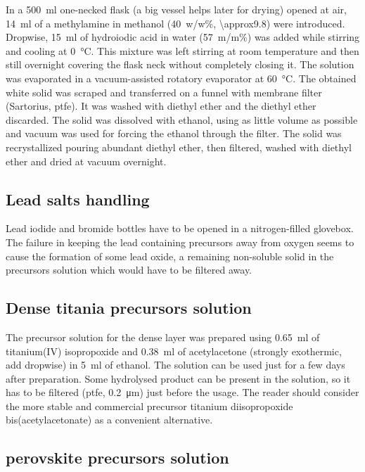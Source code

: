 		In a \SI{500}{\ml} one-necked flask (a big vessel helps later for drying) opened at air, \SI{14}{\ml} of a methylamine in methanol (40~w/w\%, \SI{\approx9.8}{\Molar}) were introduced. Dropwise, \SI{15}{\ml} of hydroiodic acid in water (57~m/m\%) was added while stirring and cooling at \SI{0}{\celsius}. This mixture was left stirring at room temperature and then still overnight covering the flask neck without completely closing it.
		The solution was evaporated in a vacuum-assisted rotatory evaporator at \SI{60}{\celsius}.
		The obtained white solid was scraped and transferred on a funnel with membrane filter (Sartorius, \gls{ptfe}). It was washed with diethyl ether and the diethyl ether discarded. The solid was dissolved with ethanol, using as little volume as possible and vacuum was used for forcing the ethanol through the filter. The solid was recrystallized pouring abundant diethyl ether, then filtered, washed with diethyl ether and dried at vacuum overnight.

	\subsection{Lead salts handling}

		Lead iodide and bromide bottles have to be opened in a nitrogen-filled glovebox. The failure in keeping the lead containing precursors away from oxygen seems to cause the formation of some lead oxide, a remaining non-soluble solid in the precursors solution which would have to be filtered away.

	\subsection{Dense titania precursors solution}\label{precursors_tio2}

		The precursor solution for the dense \TiOtwo layer was prepared using \SI{0.65}{\ml} of titanium(IV) isopropoxide and \SI{0.38}{\ml} of acetylacetone (strongly exothermic, add dropwise) in \SI{5}{\ml} of ethanol. The solution can be used just for a few days after preparation. Some hydrolysed product can be present in the solution, so it has to be filtered (\gls{ptfe}, \SI{0.2}{\um}) just before the usage. The reader should consider the more stable and commercial precursor titanium diisopropoxide bis(acetylacetonate) as a convenient alternative.

	\subsection{ perovskite precursors solution}\label{precursors_mapicl}


